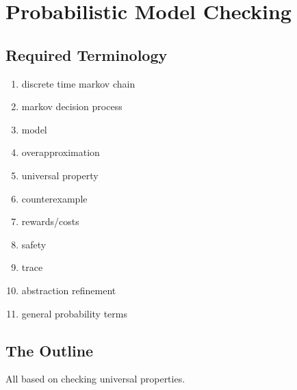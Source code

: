 \section{Probabilistic Model Checking}
\label{sec:pmc}

\subsection{Required Terminology}

  \begin{enumerate}
   \item discrete time markov chain
   \item markov decision process
   \item model
   \item overapproximation
   \item universal property
   \item counterexample
   \item rewards/costs
   \item safety
   \item trace
   \item abstraction refinement
   \item general probability terms
  \end{enumerate}

\subsection{The Outline}

All based on checking universal properties.

